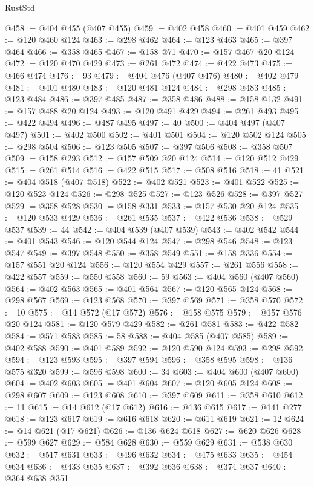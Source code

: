 \begin{lexlean}{RustStd}
\begin{coremodule}
@458 := @404 @455 (@407 @455)
@459 := @402 @458
@460 := @401 @459
@462 := @120 @460 @124
@463 := @298 @462
@464 := @123 @463
@465 := @397 @464
@466 := @358 @465
@467 := @158 @71
@470 := @157 @467 @20 @124
@472 := @120 @470 @429
@473 := @261 @472
@474 := @422 @473
@475 := @466 @474
@476 := 93
@479 := @404 @476 (@407 @476)
@480 := @402 @479
@481 := @401 @480
@483 := @120 @481 @124
@484 := @298 @483
@485 := @123 @484
@486 := @397 @485
@487 := @358 @486
@488 := @158 @132
@491 := @157 @488 @20 @124
@493 := @120 @491 @429
@494 := @261 @493
@495 := @422 @494
@496 := @487 @495
@497 := 40
@500 := @404 @497 (@407 @497)
@501 := @402 @500
@502 := @401 @501
@504 := @120 @502 @124
@505 := @298 @504
@506 := @123 @505
@507 := @397 @506
@508 := @358 @507
@509 := @158 @293
@512 := @157 @509 @20 @124
@514 := @120 @512 @429
@515 := @261 @514
@516 := @422 @515
@517 := @508 @516
@518 := 41
@521 := @404 @518 (@407 @518)
@522 := @402 @521
@523 := @401 @522
@525 := @120 @523 @124
@526 := @298 @525
@527 := @123 @526
@528 := @397 @527
@529 := @358 @528
@530 := @158 @331
@533 := @157 @530 @20 @124
@535 := @120 @533 @429
@536 := @261 @535
@537 := @422 @536
@538 := @529 @537
@539 := 44
@542 := @404 @539 (@407 @539)
@543 := @402 @542
@544 := @401 @543
@546 := @120 @544 @124
@547 := @298 @546
@548 := @123 @547
@549 := @397 @548
@550 := @358 @549
@551 := @158 @336
@554 := @157 @551 @20 @124
@556 := @120 @554 @429
@557 := @261 @556
@558 := @422 @557
@559 := @550 @558
@560 := 59
@563 := @404 @560 (@407 @560)
@564 := @402 @563
@565 := @401 @564
@567 := @120 @565 @124
@568 := @298 @567
@569 := @123 @568
@570 := @397 @569
@571 := @358 @570
@572 := 10
@575 := @14 @572 (@17 @572)
@576 := @158 @575
@579 := @157 @576 @20 @124
@581 := @120 @579 @429
@582 := @261 @581
@583 := @422 @582
@584 := @571 @583
@585 := 58
@588 := @404 @585 (@407 @585)
@589 := @402 @588
@590 := @401 @589
@592 := @120 @590 @124
@593 := @298 @592
@594 := @123 @593
@595 := @397 @594
@596 := @358 @595
@598 := @136 @575 @320
@599 := @596 @598
@600 := 34
@603 := @404 @600 (@407 @600)
@604 := @402 @603
@605 := @401 @604
@607 := @120 @605 @124
@608 := @298 @607
@609 := @123 @608
@610 := @397 @609
@611 := @358 @610
@612 := 11
@615 := @14 @612 (@17 @612)
@616 := @136 @615
@617 := @141 @277
@618 := @123 @617
@619 := @616 @618
@620 := @611 @619
@621 := 12
@624 := @14 @621 (@17 @621)
@626 := @136 @624 @618
@627 := @620 @626
@628 := @599 @627
@629 := @584 @628
@630 := @559 @629
@631 := @538 @630
@632 := @517 @631
@633 := @496 @632
@634 := @475 @633
@635 := @454 @634
@636 := @433 @635
@637 := @392 @636
@638 := @374 @637
@640 := @364 @638 @351

\end{coremodule}
\end{lexlean}
